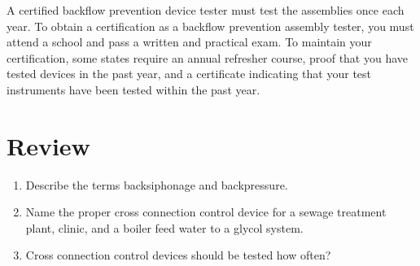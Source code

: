 \documentclass[10pt]{article}
\begin{document}
A certified backflow prevention device tester must test the assemblies once each year. To obtain a certification as a backflow prevention assembly tester, you must attend a school and pass a written and practical exam. To maintain your certification, some states require an annual refresher course, proof that you have tested devices in the past year, and a certificate indicating that your test instruments have been tested within the past year.

\section{Review}
\begin{enumerate}
  \item Describe the terms backsiphonage and backpressure.

  \item Name the proper cross connection control device for a sewage treatment plant, clinic, and a boiler feed water to a glycol system.

  \item Cross connection control devices should be tested how often?

\end{enumerate}
\end{document}
